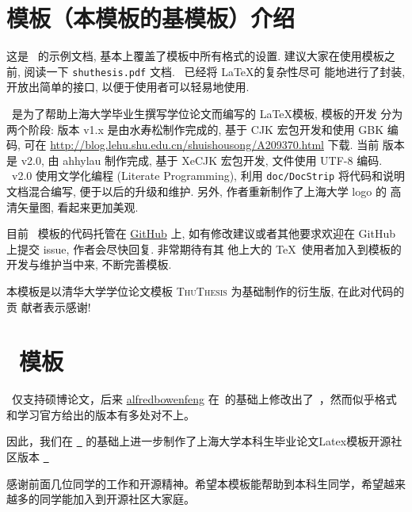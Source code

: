 {}
\label{cha:intro}

\section{\shuthesis 模板（本模板的基模板）介绍}
这是 \shuthesis\ 的示例文档, 基本上覆盖了模板中所有格式的设置. 建议大家在使用模板之
前, 阅读一下 \texttt{shuthesis.pdf} 文档. \shuthesis\ 已经将 \LaTeX 的复杂性尽可
能地进行了封装, 开放出简单的接口, 以便于使用者可以轻易地使用.

\shuthesis\ 是为了帮助上海大学毕业生撰写学位论文而编写的 \LaTeX 模板, 模板的开发
分为两个阶段: 版本 v1.x 是由水寿松制作完成的, 基于 CJK 宏包开发和使用 GBK 编码, 
可在 \url{http://blog.lehu.shu.edu.cn/shuishousong/A209370.html} 下载. 当前
版本是 v2.0, 由 ahhylau 制作完成, 基于 XeCJK 宏包开发, 文件使用 UTF-8 编码. 
\shuthesis\ v2.0 使用文学化编程 (Literate Programming), 利用 \texttt{doc/DocStrip} 
将代码和说明文档混合编写, 便于以后的升级和维护. 另外, 作者重新制作了上海大学 logo 的
高清矢量图, 看起来更加美观. 

目前 \shuthesis\ 模板的代码托管在 \href{https://github.com/ahhylau/shuthesis}{GitHub} 
上, 如有修改建议或者其他要求欢迎在 GitHub 上提交 issue, 作者会尽快回复. 非常期待有其
他上大的 \TeX\ 使用者加入到模板的开发与维护当中来, 不断完善模板.

本模板是以清华大学学位论文模板 \textsc{ThuThesis} 为基础制作的衍生版, 在此对代码的贡
献者表示感谢!

\section{\shubachelorthesisOSC\ 模板}
\shuthesis\ 仅支持硕博论文，后来 \href{https://github.com/alfredbowenfeng}{alfredbowenfeng}
在\shuthesis\ 的基础上修改出了\shubachelorthesis\ ，然而似乎格式和学习官方给出的版本有多处对不上。

因此，我们在 \href{https://github.com/alfredbowenfeng/SHU-Bachelor-Thesis}{\shubachelorthesis\ } 
的基础上进一步制作了上海大学本科生毕业论文Latex模板开源社区版本
\href{https://github.com/EnJiang/SHU-Bachelor-Thesis-OSC}{\shubachelorthesisOSC\ }


感谢前面几位同学的工作和开源精神。希望本模板能帮助到本科生同学，希望越来越多的同学能加入到开源社区大家庭。

